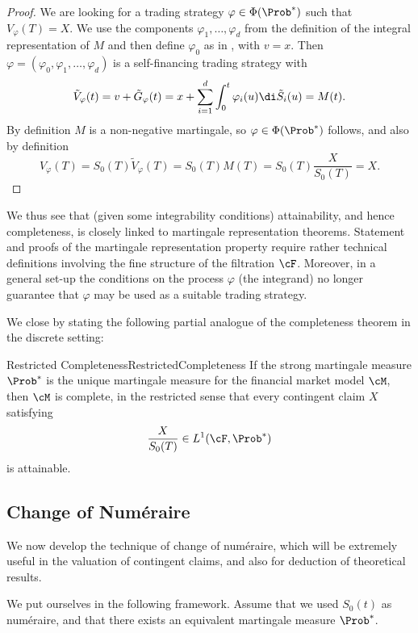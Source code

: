\begin{proof}
	We are looking for a trading strategy $\varphi \in \Phi(\Prob^*)$ such that $V_{\varphi}(T) = X$. We use the components $\varphi_1, \dots, \varphi_d$ from the definition of the integral representation of $M$ and then define $\varphi_0$ as in , with $v=x$. Then $\varphi = (\varphi_0, \varphi_1, \dots, \varphi_d)$ is a self-financing trading strategy with
	\[
		\tilde{V}_{\varphi}(t) = v + \tilde{G}_{\varphi}(t) = x + \sum_{i=1}^d \int_0^t \varphi_i(u) \di \tilde{S}_i(u) = M(t).
	\]
	By definition $M$ is a non-negative martingale, so $\varphi \in \Phi(\Prob^*)$ follows, and also by definition
	\[
		V_{\varphi}(T) = S_0(T)\tilde{V}_{\varphi}(T) = S_0(T)M(T) = S_0(T)\frac{X}{S_0(T)} = X.
	\]
\end{proof}

We thus see that (given some integrability conditions) attainability, and hence completeness, is closely linked to martingale representation theorems. Statement and proofs of the martingale representation property require rather technical definitions involving the fine structure of the filtration $\cF$. Moreover, in a general set-up the conditions on the process $\varphi$ (the integrand) no longer guarantee that $\varphi$ may be used as a suitable trading strategy.

We close by stating the following partial analogue of the completeness theorem in the discrete setting:

\begin{thm}{Restricted Completeness}{RestrictedCompleteness}
	If the strong martingale measure $\Prob^*$ is the unique martingale measure for the financial market model $\cM$, then $\cM$ is complete, in the restricted sense that every contingent claim $X$ satisfying
	\[
		\frac{X}{S_0(T)} \in L^1(\cF, \Prob^*)
	\]
	is attainable.
\end{thm}

\subsection{Change of Num\'{e}raire}

We now develop the technique of change of num\'{e}raire, which will be extremely useful in the valuation of contingent claims, and also for deduction of theoretical results.

We put ourselves in the following framework. Assume that we used \(S_0(t)\) as num\'{e}raire, and that there exists an equivalent martingale measure \(\Prob^*\).

